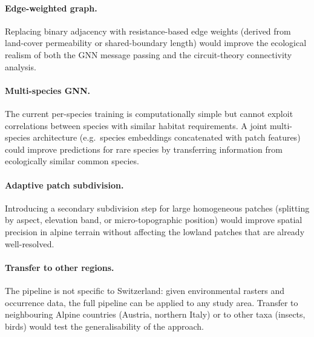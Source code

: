 \paragraph{Edge-weighted graph.}
Replacing binary adjacency with resistance-based edge
weights (derived from land-cover permeability or
shared-boundary length) would improve the ecological
realism of both the GNN message passing and the
circuit-theory connectivity analysis.

\paragraph{Multi-species GNN.}
The current per-species training is computationally
simple but cannot exploit correlations between species
with similar habitat requirements. A joint multi-species
architecture (e.g.\ species embeddings concatenated with
patch features) could improve predictions for rare species
by transferring information from ecologically similar
common species.

\paragraph{Adaptive patch subdivision.}
Introducing a secondary subdivision step for large
homogeneous patches (splitting by aspect, elevation
band, or micro-topographic position) would improve
spatial precision in alpine terrain without affecting the
lowland patches that are already well-resolved.

\paragraph{Transfer to other regions.}
The pipeline is not specific to Switzerland: given
environmental rasters and occurrence data, the full
pipeline can be applied to any study area. Transfer to
neighbouring Alpine countries (Austria, northern Italy)
or to other taxa (insects, birds) would test the
generalisability of the approach.
